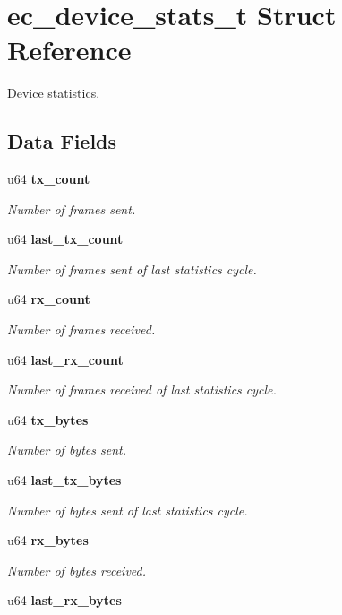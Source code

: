 \section{ec\-\_\-device\-\_\-stats\-\_\-t \-Struct \-Reference}
\label{structec__device__stats__t}


\-Device statistics.  


\subsection*{\-Data \-Fields}
\begin{DoxyCompactItemize}
\item 
u64 {\bf tx\-\_\-count}
\begin{DoxyCompactList}\small\item\em \-Number of frames sent. \end{DoxyCompactList}\item 
u64 {\bf last\-\_\-tx\-\_\-count}
\begin{DoxyCompactList}\small\item\em \-Number of frames sent of last statistics cycle. \end{DoxyCompactList}\item 
u64 {\bf rx\-\_\-count}
\begin{DoxyCompactList}\small\item\em \-Number of frames received. \end{DoxyCompactList}\item 
u64 {\bf last\-\_\-rx\-\_\-count}
\begin{DoxyCompactList}\small\item\em \-Number of frames received of last statistics cycle. \end{DoxyCompactList}\item 
u64 {\bf tx\-\_\-bytes}
\begin{DoxyCompactList}\small\item\em \-Number of bytes sent. \end{DoxyCompactList}\item 
u64 {\bf last\-\_\-tx\-\_\-bytes}
\begin{DoxyCompactList}\small\item\em \-Number of bytes sent of last statistics cycle. \end{DoxyCompactList}\item 
u64 {\bf rx\-\_\-bytes}
\begin{DoxyCompactList}\small\item\em \-Number of bytes received. \end{DoxyCompactList}\item 
u64 {\bf last\-\_\-rx\-\_\-bytes}\label{structec__device__stats__t_af577e001b9fa7ca11696eb99e4dc1c94}


\end{DoxyCompactItemize}
